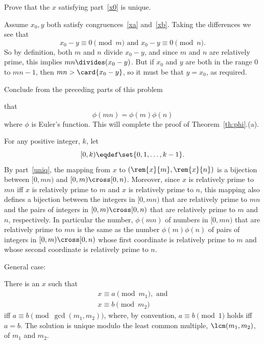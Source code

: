 \begin{notesproblem}
\ppart\label{uniq} Prove that the $x$ satisfying part~\eqref{x0} is unique.

\begin{solution}
Assume $x_0,y$ both satisfy congruences~\eqref{xa}
and~\eqref{xb}.  Taking the differences we see that
\[
x_0 - y \equiv 0 \pmod{m} \text{  and  } x_0 - y \equiv 0 \pmod{n}.
\]
So by definition, both $m$ and $n$ divide $x_0 - y$, and since $m$ and $n$
are relatively prime, this implies $mn \divides (x_0 - y)$.  But if $x_0$
and $y$ are both in the range $0$ to $mn-1$, then $mn > \card{x_0 - y}$,
so it must be that $y = x_0$, as required.
\end{solution}

\ppart Conclude from the preceding parts of this problem

that
\[
\phi(mn)=\phi(m)\phi(n)
\]
where $\phi$ is Euler's function.  This will complete the proof of
Theorem~\ref{th:phi}.(a).

\begin{solution}
For any positive integer, $k$, let
\[
[0,k) \eqdef \set{0,1,\dots, k-1}.
\]
By part~\eqref{uniq}, the mapping from $x$ to $(\rem{x}{m},\rem{x}{n})$ is
a bijection between $[0,mn)$ and $[0,m) \cross [0,n)$.  Moreover, since
$x$ is relatively prime to $mn$ iff $x$ is relatively prime to $m$ and $x$
is relatively prime to $n$, 
this mapping also defines a bijection between the integers in $[0,mn)$
that are relatively prime to $mn$ and the pairs of integers in $[0,m)
\cross [0,n)$ that are relatively prime to $m$ and $n$, respectively.  In
particular the number, $\phi(mn)$ of numbers in $[0,mn)$ that are
relatively prime to $mn$ is the same as the number $\phi(m)\phi(n)$ of
pairs of integers in $[0,m) \cross [0,n)$ whose first coordinate is
relatively prime to $m$ and whose second coordinate is relatively prime to
$n$.  
\end{solution}

\eparts
\iffalse

General case:

There is an $x$ such that
\begin{align}
x \equiv a \pmod{m_1}, \text{ and}\label{xa}\\
x \equiv b \pmod{m_2}\label{xb}
\end{align}
iff $a \equiv b \pmod{\gcd(m_1, m_2)}$, where, by convention, $a \equiv b
\pmod{1}$ holds iff $a=b$.  The solution is unique modulo the least common
multiple, $\lcm(m_1, m_2)$, of $m_1$ and $m_2$.


\end{notesproblem}

